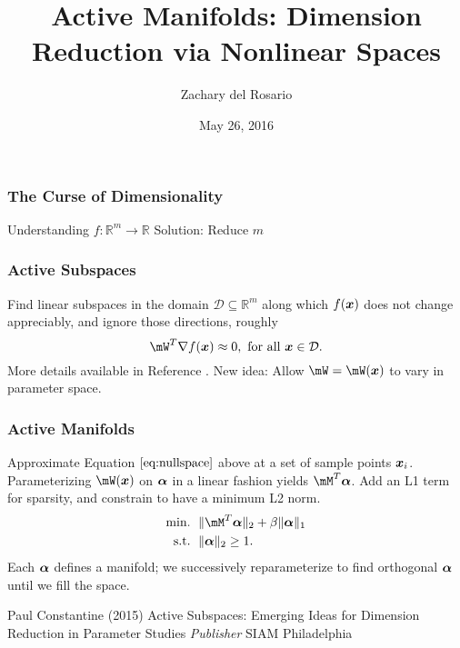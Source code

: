 \documentclass{beamer}
\title[Active Manifolds]{Active Manifolds: Dimension Reduction via Nonlinear Spaces} %
\author{Zachary del Rosario} %
\date{May 26, 2016} %
\begin{document}
\begin{frame}
\titlepage %
\end{frame}


\begin{frame}
\frametitle{The Curse of Dimensionality}
\centering
Understanding $f:\mathbb{R}^m\to\mathbb{R}$
Solution: Reduce $m$
\end{frame}


\begin{frame}
\frametitle{Active Subspaces}
Find linear subspaces in the domain $\mathcal{D}\subseteq\mathbb{R}^m$ along which $f(\boldsymbol{x})$ does not change appreciably, and ignore those directions, roughly
\begin{equation}
\mW^T\nabla f(\vx) \approx 0, \text{ for all }\vx\in \mathcal{D}.\label{eq:nullspace}
\end{equation}
More details available in Reference \cite{p1}. New idea: Allow $\mW=\mW(\vx)$ to vary in parameter space.
\end{frame}


\begin{frame}
\frametitle{Active Manifolds}
Approximate Equation $\ref{eq:nullspace}$ above at a set of sample points $\boldsymbol{x}_i$. Parameterizing $\mW(\vx)$ on $\boldsymbol{\alpha}$ in a linear fashion yields $\mM^T\vsym{\alpha}$. Add an L1 term for sparsity, and constrain to have a minimum L2 norm.
\begin{equation}
\begin{aligned}
\text{min. }&\, \|\mM^T\vsym{\alpha}\|_2 + \beta\|\vsym{\alpha}\|_1 \\
\text{s.t. }&\, \|\vsym{\alpha}\|_2 \geq 1.
\end{aligned}
\end{equation}
Each $\boldsymbol{\alpha}$ defines a manifold; we successively reparameterize to find orthogonal $\boldsymbol{\alpha}$ until we fill the space.
\end{frame}


\begin{frame}
\begin{thebibliography}{99}
 Paul Constantine (2015)
\newblock Active Subspaces: Emerging Ideas for Dimension Reduction in Parameter Studies
\newblock \emph{Publisher} SIAM Philadelphia
\end{thebibliography}
\end{frame}

\end{document}
